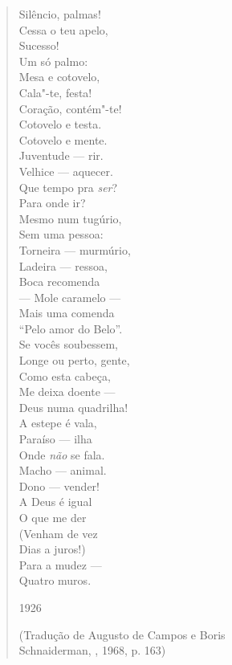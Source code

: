 \begin{verse}
Silêncio, palmas! \\
Cessa o teu apelo, \\
Sucesso! \\
\hspace{5pt}Um só palmo: \\
Mesa e cotovelo, \\[8pt]
Cala"-te, festa! \\
Coração, contém"-te! \\
Cotovelo e testa. \\
Cotovelo e mente. \\[8pt]
Juventude --- rir. \\
Velhice --- aquecer. \\
Que tempo pra \emph{ser}? \\
Para onde ir? \\[8pt]
Mesmo num tugúrio, \\
Sem uma pessoa: \\
Torneira --- murmúrio, \\
Ladeira --- ressoa, \\[8pt]
Boca recomenda \\
--- Mole caramelo --- \\
Mais uma comenda \\
``Pelo amor do Belo''. \\[8pt]
Se vocês soubessem, \\
Longe ou perto, gente, \\
Como esta cabeça, \\
Me deixa doente --- \\[8pt]
Deus numa quadrilha! \\
A estepe é vala, \\
Paraíso --- ilha \\
Onde \emph{não} se fala. \\[8pt]
Macho --- animal. \\
Dono --- vender! \\
A Deus é igual \\
O que me der \\[8pt]
(Venham de vez \\
Dias a juros!) \\
Para a mudez --- \\
Quatro muros. 

1926

(Tradução de Augusto de Campos e Boris\\ Schnaiderman, , 1968, p. 163)

  \end{verse}

